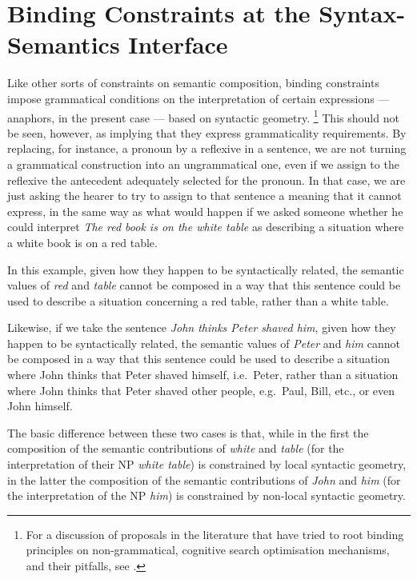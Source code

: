 \documentclass[output=paper
	        ,collection
	        ,collectionchapter
 	        ,biblatex
                ,babelshorthands
                ,newtxmath
                ,draftmode
                ,colorlinks, citecolor=brown
]{langscibook}
\begin{document}
\section{Binding Constraints at the Syntax-Semantics Interface\label{sem}}

Like other sorts of constraints on semantic composition, binding
constraints impose grammatical conditions on the interpretation of certain expressions
--- anaphors, in the present case --- based on syntactic geometry.%
\footnote{
For a discussion of proposals in the literature that have tried to root binding principles on non-grammatical,
cognitive search optimisation mechanisms, and their pitfalls, see \citep{branco:2000,branco:2003,branco:2004}.
}
This should not
be seen, however, as implying that they
express grammaticality requirements. By replacing, for instance, a pronoun 
by a reflexive in a sentence, we are not turning a grammatical construction into 
an ungrammatical one, even if we assign to the reflexive the 
antecedent adequately selected for the pronoun. In that case, we 
are just asking the hearer to try to assign to that sentence a 
meaning that it cannot express, in the same way as what would 
happen if we asked someone whether he could interpret {\it The red book 
is on the white table} as describing a situation where a white 
book is on a red table. 

In this example, given how they happen to be syntactically related, 
the semantic values of {\it red} and {\it table} cannot be composed in a way 
that this sentence could be used to describe a situation 
concerning a red table, rather than a white table. 

Likewise, if we 
take the sentence {\it John thinks Peter shaved him}, given how they happen to be 
syntactically related, the semantic values of {\it Peter} and {\it him} cannot 
be composed in a way that this sentence could be used to describe a 
situation where John thinks that Peter shaved himself, i.e.\ Peter, rather than
a situation where John thinks that Peter shaved other people, e.g.\ Paul,
Bill, etc., or even John himself. 

The 
basic difference between these two cases is that, while in the 
first the composition of the semantic contributions of {\it white} and 
{\it table} (for the interpretation of their NP {\it white table}) is constrained by local
syntactic geometry, in the
latter the composition of the semantic contributions of {\it John} 
and {\it him} (for the interpretation of the NP {\it him}) is 
constrained by non-local syntactic geometry.
\end{document}
